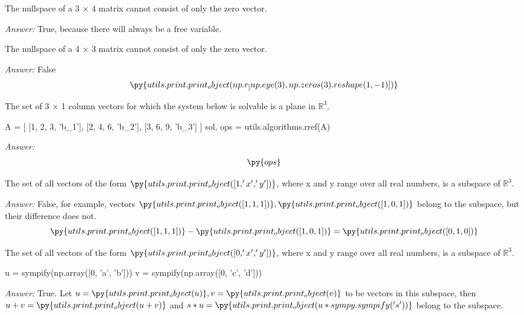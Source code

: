 \documentclass[letterpaper]{article}
\newcommand{\ans}{\textit{Answer: }}
\newenvironment{question}[2][Question]{\begin{trivlist}
\item[\hskip \labelsep {\bfseries #1}\hskip \labelsep {\bfseries #2.}]}{\end{trivlist}}
\newcommand{\printobj}[1]{\py{utils.print.print_object(#1)}}
\begin{document}
\begin{question}{1.25}
    The nullspace of a 3 × 4 matrix cannot consist of only the zero vector.

    \ans True, because there will always be a free variable.
    
\end{question}

\begin{question}{1.26}
    The nullspace of a 4 × 3 matrix cannot consist of only the zero vector.

    \ans False
    $$ \printobj{np.r_[np.eye(3), np.zeros(3).reshape(1, -1)]} $$
    
\end{question}

\begin{question}{1.31}
    The set of 3 × 1 column vectors for which the system below is
    solvable is a plane in $\mathbb{R}^3$.

    \begin{pycode}
A = [
    [1, 2, 3, 'b_1'],
    [2, 4, 6, 'b_2'],
    [3, 6, 9, 'b_3']
]
sol, ops = utils.algorithms.rref(A)
    \end{pycode}

    \ans
    \begin{align*}
        \py{ops}
    \end{align*}

\end{question}

\begin{question}{1.33}
    The set of all vectors of the form $\printobj{[1, 'x', 'y']}$, 
    where x and y range over all real numbers, is a subspace of $\mathbb{R}^3$.

    \ans False, for example, vectors $\printobj{[1, 1, 1]}, \printobj{[1, 0, 1]}$
    belong to the subspace, but their difference does not. 
    $$\printobj{[1, 1, 1]} - \printobj{[1, 0, 1]} = \printobj{[0, 1, 0]}$$
    
\end{question}

\begin{question}{1.34}
    The set of all vectors of the form $\printobj{[0, 'x', 'y']}$, 
    where x and y range over all real numbers, is a subspace of $\mathbb{R}^3$.

\begin{pycode}
u = sympify(np.array([0, 'a', 'b'])) 
v = sympify(np.array([0, 'c', 'd']))
\end{pycode}

    \ans True. Let $u = \printobj{u}, v = \printobj{v}$ to be vectors in this
    subspace, then $u + v = \printobj{u + v}$ and 
    $ s * u = \printobj{u * sympy.sympify('s')}$ belong to the subspace.
    
\end{question}
\end{document}
